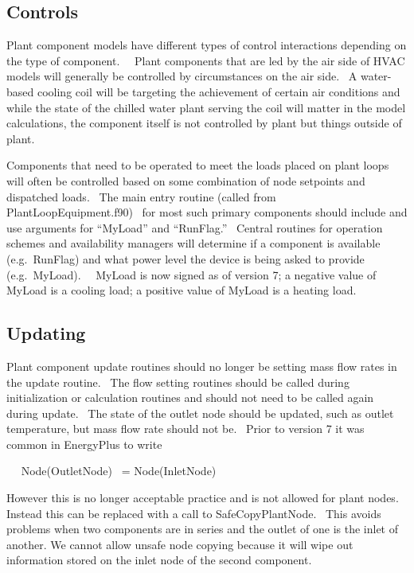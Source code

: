 \subsection{Controls}\label{controls}

Plant component models have different types of control interactions depending on the type of component.~~ Plant components that are led by the air side of HVAC models will generally be controlled by circumstances on the air side.~ A water-based cooling coil will be targeting the achievement of certain air conditions and while the state of the chilled water plant serving the coil will matter in the model calculations, the component itself is not controlled by plant but things outside of plant.

Components that need to be operated to meet the loads placed on plant loops will often be controlled based on some combination of node setpoints and dispatched loads.~ The main entry routine (called from PlantLoopEquipment.f90)~ for most such primary components should include and use arguments for ``MyLoad'' and ``RunFlag.''~ Central routines for operation schemes and availability managers will determine if a component is available (e.g.~RunFlag) and what power level the device is being asked to provide (e.g.~MyLoad).~~ MyLoad is now signed as of version 7; a negative value of MyLoad is a cooling load; a positive value of MyLoad is a heating load.

\subsection{Updating}\label{updating}

Plant component update routines should no longer be setting mass flow rates in the update routine.~ The flow setting routines should be called during initialization or calculation routines and should not need to be called again during update.~ The state of the outlet node should be updated, such as outlet temperature, but mass flow rate should not be.~ Prior to version 7 it was common in EnergyPlus to write

~~ Node(OutletNode)~ = Node(InletNode)

However this is no longer acceptable practice and is not allowed for plant nodes.~ Instead this can be replaced with a call to SafeCopyPlantNode.~ This avoids problems when two components are in series and the outlet of one is the inlet of another. We cannot allow unsafe node copying because it will wipe out information stored on the inlet node of the second component.

